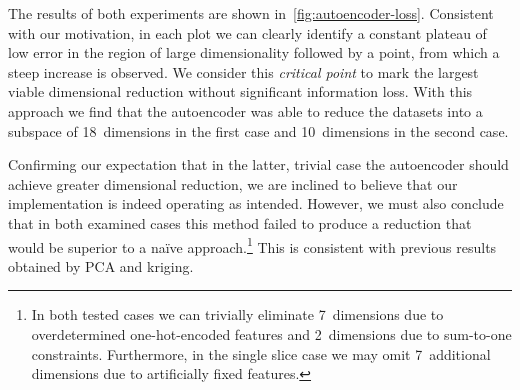 The results of both experiments are shown in~\cref{fig:autoencoder-loss}.
Consistent with our motivation, in each plot we can clearly identify a constant
plateau of low error in the region of large dimensionality followed by a point,
from which a steep increase is observed.
We consider this \textit{critical point} to mark the largest viable
dimensional reduction without significant information loss.
With this approach we find that the autoencoder was able to reduce the
datasets into a subspace of 18~dimensions in the first case and 10~dimensions in
the second case.

Confirming our expectation that in the latter, trivial case the
autoencoder should achieve greater dimensional reduction, we are inclined to
believe that our implementation is indeed operating as intended. However, we
must also conclude that in both examined cases this method failed to produce a
reduction that would be superior to a naïve approach.\footnote{In both tested cases we
	can trivially eliminate 7~dimensions due to overdetermined one-hot-encoded
	features and 2~dimensions due to sum-to-one constraints. Furthermore, in the
	single slice case we may omit 7~additional dimensions due to artificially fixed
features.} This is consistent with previous results obtained by PCA and kriging.



